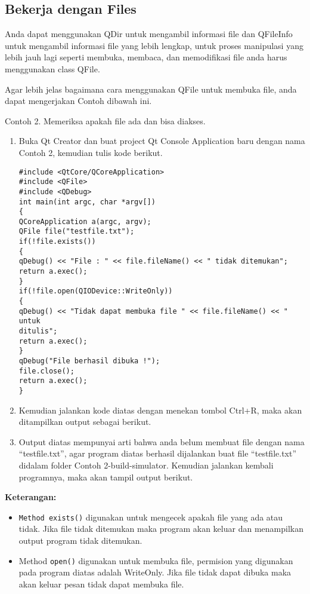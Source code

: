\subsection{Bekerja dengan Files}\label{bekerja-dengan-files}

Anda dapat menggunakan QDir untuk mengambil informasi file dan QFileInfo
untuk mengambil informasi file yang lebih lengkap, untuk proses
manipulasi yang lebih jauh lagi seperti membuka, membaca, dan
memodifikasi file anda harus menggunakan class QFile.

Agar lebih jelas bagaimana cara menggunakan QFile untuk membuka file,
anda dapat mengerjakan Contoh dibawah ini.

Contoh 2. Memeriksa apakah file ada dan bisa diakses.

\begin{enumerate}
\def\labelenumi{\arabic{enumi}.}
\item
  Buka Qt Creator dan buat project Qt Console Application baru dengan
  nama Contoh 2, kemudian tulis kode berikut.

\begin{verbatim}
#include <QtCore/QCoreApplication>
#include <QFile>
#include <QDebug>
int main(int argc, char *argv[])
{
QCoreApplication a(argc, argv);
QFile file("testfile.txt");
if(!file.exists())
{
qDebug() << "File : " << file.fileName() << " tidak ditemukan";
return a.exec();
}
if(!file.open(QIODevice::WriteOnly))
{
qDebug() << "Tidak dapat membuka file " << file.fileName() << " untuk
ditulis";
return a.exec();
}
qDebug("File berhasil dibuka !");
file.close();
return a.exec();
}
\end{verbatim}
\item
  Kemudian jalankan kode diatas dengan menekan tombol Ctrl+R, maka akan
  ditampilkan output sebagai berikut.
\item
  Output diatas mempunyai arti bahwa anda belum membuat file dengan nama
  ``testfile.txt'', agar program diatas berhasil dijalankan buat file
  ``testfile.txt'' didalam folder Contoh 2-build-simulator. Kemudian
  jalankan kembali programnya, maka akan tampil output berikut.
\end{enumerate}

\textbf{Keterangan:}

\begin{itemize}
\tightlist
\item
  \texttt{Method\ exists()} digunakan untuk mengecek apakah file yang
  ada atau tidak. Jika file tidak ditemukan maka program akan keluar dan
  menampilkan output program tidak ditemukan.
\item
  Method \texttt{open()} digunakan untuk membuka file, permision yang
  digunakan pada program diatas adalah WriteOnly. Jika file tidak dapat
  dibuka maka akan keluar pesan tidak dapat membuka file.
\end{itemize}

